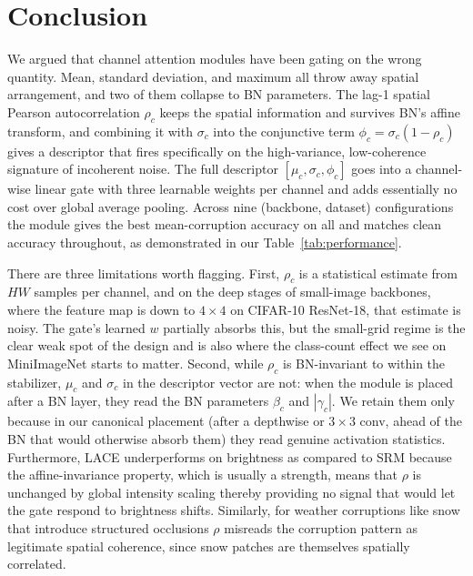 \documentclass{bmvc2k}
\begin{document}


\section{Conclusion}\label{conclusion}

We argued that channel attention modules have been gating on the wrong quantity. Mean, standard deviation, and maximum all throw away spatial arrangement, and two of them collapse to BN parameters. The lag-1 spatial Pearson autocorrelation $\rho_c$ keeps the spatial information
and survives BN's affine transform, and combining it with $\sigma_c$ into the conjunctive term $\phi_c = \sigma_c(1-\rho_c)$ gives a descriptor that fires specifically on the high-variance, low-coherence signature of incoherent noise. The full descriptor $[\mu_c, \sigma_c, \phi_c]$ goes into a channel-wise linear gate with three learnable
weights per channel and adds essentially no cost over global average pooling. Across nine (backbone, dataset) configurations the module gives the best mean-corruption accuracy on all and matches clean accuracy throughout, as demonstrated in our Table~\ref{tab:performance}.
 
There are three limitations worth flagging. First, $\rho_c$ is a statistical estimate from $HW$ samples per channel, and on the deep stages of small-image backbones, where the feature map is down to $4\!\times\!4$ on CIFAR-10 ResNet-18, that estimate is noisy. The gate's learned $w$ partially absorbs this, but the small-grid regime
is the clear weak spot of the design and is also where the class-count effect we see on MiniImageNet starts to matter. Second, while $\rho_c$ is BN-invariant to within the stabilizer, $\mu_c$ and $\sigma_c$ in the descriptor vector are not: when the module is placed after a BN layer, they read the BN parameters $\beta_c$ and $|\gamma_c|$. We retain them only because in our canonical placement (after a depthwise or $3\times3$ conv, ahead of the BN that would otherwise absorb them) they read genuine activation statistics. Furthermore, LACE underperforms on brightness as compared to SRM because the affine-invariance property, which is usually a strength, means that $\rho$ is unchanged by global intensity scaling thereby providing no signal that would let the gate respond to brightness shifts. Similarly, for weather corruptions like snow that introduce structured occlusions $\rho$ misreads the corruption pattern as legitimate spatial coherence, since snow patches are themselves spatially correlated. 
\end{document}
